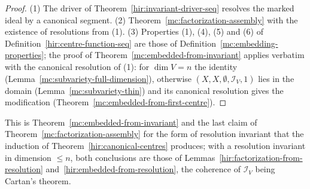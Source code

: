 \begin{proof}
\leanok
(1) The driver of Theorem~\ref{hir:invariant-driver-seq} resolves the marked ideal by a canonical segment. (2) Theorem~\ref{mc:factorization-assembly} with the
existence of resolutions from (1). (3) Properties (1), (4), (5) and (6) of Definition~\ref{hir:centre-function-seq} are those of Definition~\ref{mc:embedding-properties}; the
proof of Theorem~\ref{mc:embedded-from-invariant} applies verbatim with the canonical resolution of (1): for \(\dim V=n\) the identity
(Lemma~\ref{mc:subvariety-full-dimension}), otherwise \((X,X,\emptyset,\mathcal I_V,1)\) lies in the domain (Lemma~\ref{mc:subvariety-thin}) and its canonical resolution gives the
modification (Theorem~\ref{mc:embedded-from-first-centre}).
\end{proof}
This is Theorem~\ref{mc:embedded-from-invariant} and the last claim of Theorem~\ref{mc:factorization-assembly} for the form of resolution invariant that the
induction of Theorem~\ref{hir:canonical-centres} produces; with a resolution invariant in dimension \(\le n\), both conclusions are those of
Lemmas~\ref{hir:factorization-from-resolution} and~\ref{hir:embedded-from-resolution}, the coherence of \(\mathcal I_V\) being Cartan's theorem.

